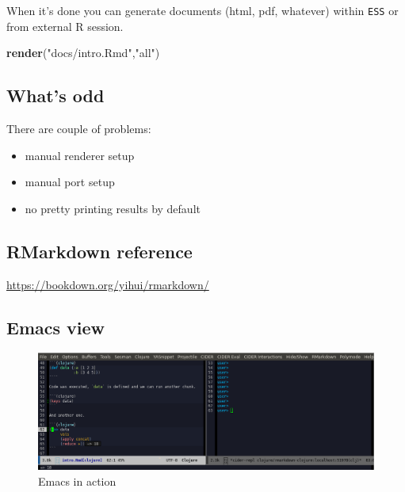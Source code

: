 \documentclass[]{article}
\newenvironment{Shaded}{\begin{snugshade}}{\end{snugshade}}
\newcommand{\KeywordTok}[1]{\textcolor[rgb]{0.13,0.29,0.53}{\textbf{#1}}}
\newcommand{\StringTok}[1]{\textcolor[rgb]{0.31,0.60,0.02}{#1}}
\newcommand{\NormalTok}[1]{#1}
\providecommand{\tightlist}{%
  \setlength{\itemsep}{0pt}\setlength{\parskip}{0pt}}
\begin{document}
When it's done you can generate documents (html, pdf, whatever) within
\texttt{ESS} or from external R session.

\begin{Shaded}
\begin{Highlighting}[]
\KeywordTok{render}\NormalTok{(}\StringTok{"docs/intro.Rmd"}\NormalTok{,}\StringTok{"all"}\NormalTok{)}
\end{Highlighting}
\end{Shaded}

\subsection{What's odd}\label{whats-odd}

There are couple of problems:

\begin{itemize}
\tightlist
\item
  manual renderer setup
\item
  manual port setup
\item
  no pretty printing results by default
\end{itemize}

\subsection{RMarkdown reference}\label{rmarkdown-reference}

\url{https://bookdown.org/yihui/rmarkdown/}

\subsection{Emacs view}\label{emacs-view}

\begin{figure}
\centering
\includegraphics{emacs.png}
\caption{Emacs in action}
\end{figure}
\end{document}
